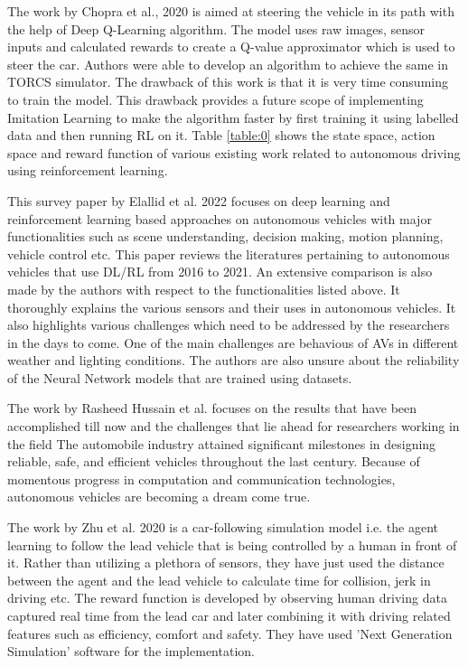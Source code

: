 \par
The work by Chopra et al., 2020 \cite{chopra2020end} is aimed at steering the vehicle in its path with the help of Deep Q-Learning algorithm. The model uses raw images, sensor inputs and calculated rewards to create a Q-value approximator which is used to steer the car. Authors were able to develop an algorithm to achieve the same in TORCS simulator. The drawback of this work is that it is very time consuming to train the model. This drawback provides a future scope of implementing Imitation Learning to make the algorithm faster by first training it using labelled data and then running RL on it. 
Table \ref{table:0} shows the state space, action space and reward function of various existing work related to autonomous driving using reinforcement learning. 

This survey paper by Elallid et al. 2022 \cite{elallid2022comprehensive} focuses on deep learning and reinforcement learning based approaches on autonomous vehicles with major functionalities such as scene understanding, decision making, motion planning, vehicle control etc. This paper reviews the literatures pertaining to autonomous vehicles that use DL/RL from 2016 to 2021. An extensive comparison is also made by the authors with respect to the functionalities listed above. It thoroughly explains the various sensors and their uses in autonomous vehicles. It also highlights various challenges which need to be addressed by the researchers in the days to come. One of the main challenges are behavious of AVs in different weather and lighting conditions. The authors are also unsure about the reliability of the Neural Network models that are trained using datasets. 

The work by Rasheed Hussain et al.  focuses on the results that have been accomplished till now and the challenges that lie ahead for researchers working in the field  The automobile industry attained significant milestones in designing reliable, safe, and efficient vehicles throughout the last century. Because of momentous progress in computation and communication technologies, autonomous vehicles are becoming a dream come true. 

The work by Zhu et al. 2020  is a car-following simulation model i.e. the agent learning to follow the lead vehicle that is being controlled by a human in front of it. Rather than utilizing a plethora of sensors, they have just used the distance between the agent and the lead vehicle to calculate time for collision, jerk in driving etc. The reward function is developed by observing human driving data captured real time from the lead car and later combining it with driving related features such as efficiency, comfort and safety. They have used 'Next Generation Simulation' software for the implementation. 


